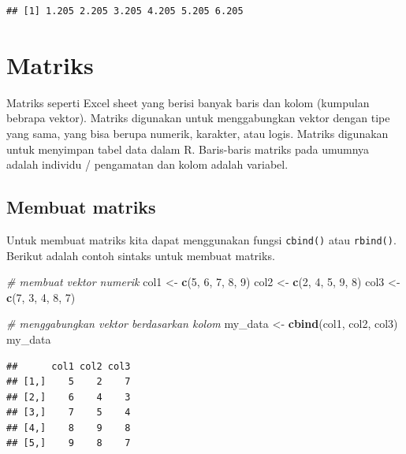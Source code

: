 \documentclass[
]{book}
\newenvironment{Shaded}{\begin{snugshade}}{\end{snugshade}}
\newcommand{\CommentTok}[1]{\textcolor[rgb]{0.56,0.35,0.01}{\textit{#1}}}
\newcommand{\DecValTok}[1]{\textcolor[rgb]{0.00,0.00,0.81}{#1}}
\newcommand{\FunctionTok}[1]{\textcolor[rgb]{0.13,0.29,0.53}{\textbf{#1}}}
\newcommand{\NormalTok}[1]{#1}
\newcommand{\OtherTok}[1]{\textcolor[rgb]{0.56,0.35,0.01}{#1}}
\theoremstyle{definition}
\theoremstyle{definition}
\theoremstyle{definition}
\theoremstyle{definition}
\theoremstyle{remark}
\begin{document}
\begin{verbatim}
## [1] 1.205 2.205 3.205 4.205 5.205 6.205
\end{verbatim}

\hypertarget{matriks}{%
\section{Matriks}\label{matriks}}

Matriks seperti Excel sheet yang berisi banyak baris dan kolom (kumpulan bebrapa vektor). Matriks digunakan untuk menggabungkan vektor dengan tipe yang sama, yang bisa berupa numerik, karakter, atau logis. Matriks digunakan untuk menyimpan tabel data dalam R. Baris-baris matriks pada umumnya adalah individu / pengamatan dan kolom adalah variabel.

\hypertarget{creatematrix}{%
\subsection{Membuat matriks}\label{creatematrix}}

Untuk membuat matriks kita dapat menggunakan fungsi \texttt{cbind()} atau \texttt{rbind()}. Berikut adalah contoh sintaks untuk membuat matriks.

\begin{Shaded}
\begin{Highlighting}[]
\CommentTok{\# membuat vektor numerik}
\NormalTok{col1 }\OtherTok{\textless{}{-}} \FunctionTok{c}\NormalTok{(}\DecValTok{5}\NormalTok{, }\DecValTok{6}\NormalTok{, }\DecValTok{7}\NormalTok{, }\DecValTok{8}\NormalTok{, }\DecValTok{9}\NormalTok{)}
\NormalTok{col2 }\OtherTok{\textless{}{-}} \FunctionTok{c}\NormalTok{(}\DecValTok{2}\NormalTok{, }\DecValTok{4}\NormalTok{, }\DecValTok{5}\NormalTok{, }\DecValTok{9}\NormalTok{, }\DecValTok{8}\NormalTok{)}
\NormalTok{col3 }\OtherTok{\textless{}{-}} \FunctionTok{c}\NormalTok{(}\DecValTok{7}\NormalTok{, }\DecValTok{3}\NormalTok{, }\DecValTok{4}\NormalTok{, }\DecValTok{8}\NormalTok{, }\DecValTok{7}\NormalTok{)}

\CommentTok{\# menggabungkan vektor berdasarkan kolom}
\NormalTok{my\_data }\OtherTok{\textless{}{-}} \FunctionTok{cbind}\NormalTok{(col1, col2, col3)}
\NormalTok{my\_data}
\end{Highlighting}
\end{Shaded}

\begin{verbatim}
##      col1 col2 col3
## [1,]    5    2    7
## [2,]    6    4    3
## [3,]    7    5    4
## [4,]    8    9    8
## [5,]    9    8    7
\end{verbatim}
\end{document}
